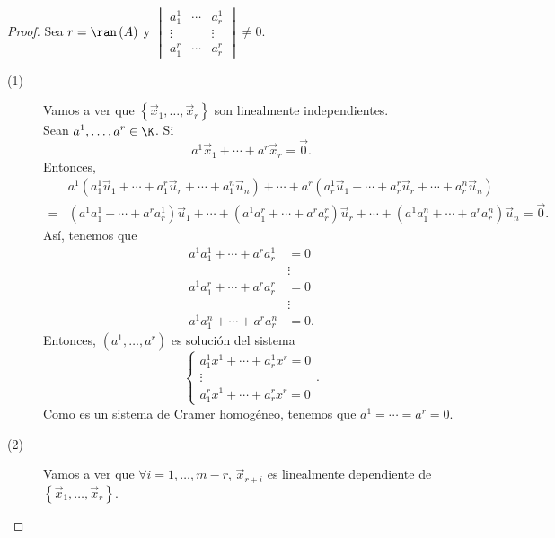 \begin{proof}
	Sea $\displaystyle r = \ran\left(A\right) $ y $\displaystyle \begin{vmatrix} a^{1}_{1} & \cdots & a^{1}_{r}\\
	\vdots & & \vdots \\
a^{r}_{1} & \cdots & a^{r}_{r}\end{vmatrix} \neq 0 $.
\begin{description}
	\item[(1)] Vamos a ver que $\displaystyle \left\{ \vec{x}_{1}, \ldots, \vec{x}_{r}\right\}  $ son linealmente independientes. \\
	Sean $\displaystyle a^{1}, \ldots, a^{r} \in \K $. Si 
	\[a^{1}\vec{x}_{1} + \cdots + a^{r}\vec{x}_{r} = \vec{0} .\]
	Entonces, 
	\[
	\begin{split}
		& a^{1}\left(a^{1}_{1}\vec{u}_{1} + \cdots + a^{r}_{1}\vec{u}_{r} + \cdots +a^{n}_{1}\vec{u}_{n}\right) + \cdots + a^{r}\left(a^{1}_{r}\vec{u}_{1} + \cdots+a^{r}_{r}\vec{u}_{r}+\cdots + a^{n}_{r}\vec{u}_{n}\right)  \\
		= & \left(a^{1}a^{1}_{1} + \cdots + a^{r}a^{1}_{r}\right)\vec{u}_{1} + \cdots + \left(a^{1}a^{r}_{1} + \cdots + a^{r}a^{r}_{r}\right)\vec{u}_{r} + \cdots + \left(a^{1}a^{n}_{1}+ \cdots + a^{r}a^{n}_{r}\right)\vec{u}_{n} = \vec{0}.
	\end{split}
	\]
	Así, tenemos que 
	\[
	\begin{split}
		a^{1}a^{1}_{1} + \cdots + a^{r}a^{1}_{r} & = 0 \\
							 & \vdots \\
		a^{1}a^{r}_{1} + \cdots + a^{r}a^{r}_{r} & = 0 \\
							 & \vdots \\
		a^{1}a^{n}_{1}+ \cdots + a^{r}a^{n}_{r} & = 0.
	\end{split}
	\]
	Entonces, $\displaystyle \left(a^{1}, \ldots, a^{r}\right) $ es solución del sistema 
	\[
	\begin{cases}
	a^{1}_{1}x^{1} + \cdots + a^{1}_{r}x^{r} = 0\\
	\vdots \\
	a^{r}_{1}x^{1} + \cdots + a^{r}_{r}x^{r} = 0
	\end{cases}
	.\]
Como es un sistema de Cramer homogéneo, tenemos que $\displaystyle a^{1} = \cdots = a^{r} = 0 $.	
	\item[(2)] Vamos a ver que $\displaystyle \forall i = 1, \ldots, m-r $, $\displaystyle \vec{x}_{r+i} $ es linealmente dependiente de $\displaystyle \left\{ \vec{x}_{1}, \ldots, \vec{x}_{r}\right\}  $. \\

\end{description}
\end{proof}

